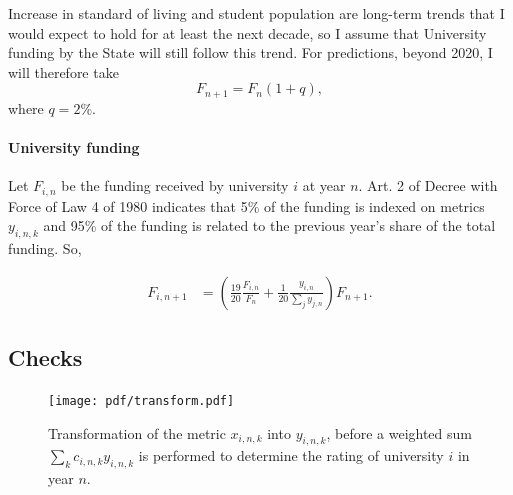 \documentclass[twocolumn]{article}
\begin{document}
Increase in standard of living and student population are long-term trends that I would expect to hold for at least the next decade, so I assume that University funding by the State will still follow this trend. For predictions, beyond 2020, I will therefore take
\begin{equation}
    F_{n+1} = F_n (1 + q), \label{eq:F}
\end{equation}
where $q = 2$\%.

\paragraph{University funding}
Let $F_{i,n}$ be the funding received by university $i$ at year $n$. Art. 2 of
Decree with Force of Law 4 of 1980 indicates that 5\% of the funding is indexed
on metrics $y_{i,n,k}$ and 95\% of the funding is related to the previous year's
share of the total funding.  So,

\begin{align}
    F_{i,n+1} &= \left( \frac{19}{20} \frac{F_{i,n}}{F_{n}} 
                      + \frac 1{20} \frac{y_{i,n}}{\sum_j y_{j,n}} 
                \right) F_{n+1}.
        \label{eq:afd}
\end{align}


\subsection{Checks}
\begin{figure}
\centering
\texttt{[image: pdf/transform.pdf]}
\caption{Transformation of the metric $x_{i,n,k}$ into $y_{i,n,k}$, before a weighted sum 
$\sum_k c_{i,n,k} y_{i,n,k}$ is performed to determine the rating of university $i$ in year $n$.}
\label{fig:transform}
\end{figure}
\end{document}
